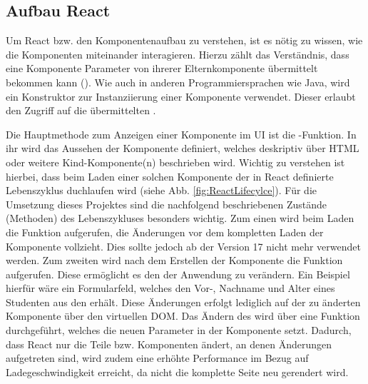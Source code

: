 
\subsection{Aufbau React}
\label{ssec:AufbauReact}

Um React bzw. den Komponentenaufbau zu verstehen, ist es nötig zu wissen, wie die Komponenten miteinander interagieren. 
Hierzu zählt \ua das Verständnis, dass eine Komponente Parameter von ihrerer Elternkomponente übermittelt bekommen kann (\props). 
Wie auch in anderen Programmiersprachen wie \zb Java, wird ein Konstruktor  zur Instanziierung einer Komponente verwendet.
Dieser erlaubt den Zugriff auf die übermittelten \props. 

Die Hauptmethode zum Anzeigen einer Komponente im \ac{UI} ist die \render-Funktion. 
In ihr wird das Aussehen der Komponente definiert, welches deskriptiv über \acs{HTML} oder weitere Kind-Kompo\-nente(n) beschrieben wird. 
Wichtig zu verstehen ist hierbei, dass beim Laden einer solchen Komponente der in React definierte Lebenszyklus duchlaufen wird (siehe Abb. \ref{fig:ReactLifecylce}).
Für die Umsetzung dieses Projektes sind die nachfolgend beschriebenen Zustände (Methoden) des Lebenszykluses besonders wichtig. 
Zum einen wird beim Laden die Funktion \cwm aufgerufen, die Änderungen vor dem kompletten Laden der Komponente vollzieht.
Dies sollte jedoch ab der Version 17 nicht mehr verwendet werden. 
Zum zweiten wird nach dem Erstellen der Komponente die Funktion \cdm aufgerufen. 
Diese ermöglicht es \zb den \state  der Anwendung zu verändern. 
Ein Beispiel hierfür wäre ein Formularfeld, welches den Vor-, Nachname und Alter eines Studenten aus den \props erhält. 
Diese Änderungen erfolgt lediglich auf der zu änderten Komponente über den virtuellen \ac{DOM}. 
Das Ändern des \state wird über eine Funktion \exampleState durchgeführt, welches die neuen Parameter in der Komponente setzt.
Dadurch, dass React nur die Teile bzw. Komponenten ändert, an denen Änderungen aufgetreten sind, wird zudem eine erhöhte Performance im Bezug auf Ladegeschwindigkeit erreicht, da nicht die komplette Seite neu gerendert wird. 

